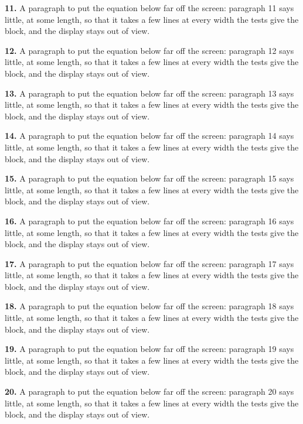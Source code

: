 \noindent\textbf{11.} A paragraph to put the equation below far off the screen: paragraph 11
says little, at some length, so that it takes a few lines at every width
the tests give the block, and the display stays out of view.

\noindent\textbf{12.} A paragraph to put the equation below far off the screen: paragraph 12
says little, at some length, so that it takes a few lines at every width
the tests give the block, and the display stays out of view.

\noindent\textbf{13.} A paragraph to put the equation below far off the screen: paragraph 13
says little, at some length, so that it takes a few lines at every width
the tests give the block, and the display stays out of view.

\noindent\textbf{14.} A paragraph to put the equation below far off the screen: paragraph 14
says little, at some length, so that it takes a few lines at every width
the tests give the block, and the display stays out of view.

\noindent\textbf{15.} A paragraph to put the equation below far off the screen: paragraph 15
says little, at some length, so that it takes a few lines at every width
the tests give the block, and the display stays out of view.

\noindent\textbf{16.} A paragraph to put the equation below far off the screen: paragraph 16
says little, at some length, so that it takes a few lines at every width
the tests give the block, and the display stays out of view.

\noindent\textbf{17.} A paragraph to put the equation below far off the screen: paragraph 17
says little, at some length, so that it takes a few lines at every width
the tests give the block, and the display stays out of view.

\noindent\textbf{18.} A paragraph to put the equation below far off the screen: paragraph 18
says little, at some length, so that it takes a few lines at every width
the tests give the block, and the display stays out of view.

\noindent\textbf{19.} A paragraph to put the equation below far off the screen: paragraph 19
says little, at some length, so that it takes a few lines at every width
the tests give the block, and the display stays out of view.

\noindent\textbf{20.} A paragraph to put the equation below far off the screen: paragraph 20
says little, at some length, so that it takes a few lines at every width
the tests give the block, and the display stays out of view.

